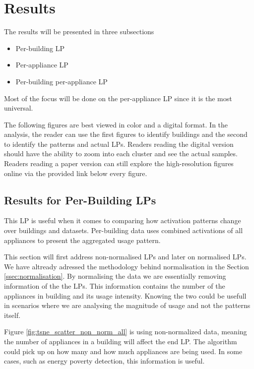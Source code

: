 \section{Results}

The results will be presented in three subsections

\begin{itemize}
	\item Per-building LP
	\item Per-appliance LP
	\item Per-building per-appliance LP
\end{itemize}

Most of the focus will be done on the per-appliance LP since it is the most universal.

The following figures are best viewed in color and a digital format. 
In the analysis, the reader can use the first figures to identify buildings and the second to identify the patterns and actual LPs.
Readers reading the digital version should have the ability to zoom into each cluster and see the actual samples. 
Readers reading a paper version can still explore the high-resolution figures online via the provided link below every figure.

\subsection{Results for Per-Building LPs}
\label{ssec:res_pb_lp}
This LP is useful when it comes to comparing how 
activation patterns change over buildings and datasets.
Per-building data uses combined activations of all appliances to present 
the aggregated usage pattern.  

This section will first address non-normalised LPs and later on normalised LPs.
We have altready adressed the methodology behind normalisation in the Section \ref{ssec:normalisation}.
By normalising the data we are essentially removing information of the the LPs.
This information contains the number of the appliances in building and its usage intensity.
Knowing the two could be usefull in scenarios where we are analysing the magnitude of usage and not the patterns itself.

Figure \ref{fig:tsne_scatter_non_norm_all} is using non-normalized data, meaning
the number of appliances in a building will affect the end LP.
The algorithm could pick up on how many and how much appliances are being used.
In some cases, such as energy poverty detection, this information is useful.


